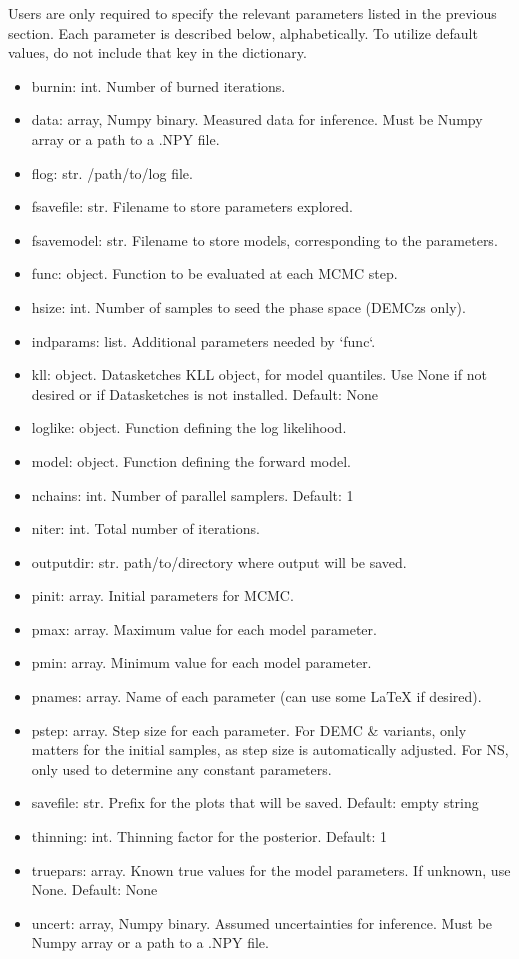 \documentclass[letterpaper, 12pt]{article}
\begin{document}
Users are only required to specify the relevant parameters listed in 
the previous section.  Each parameter is described below, alphabetically.
To utilize default values, do not include that key in the dictionary.

\begin{itemize}
\item burnin: int. Number of burned iterations.
\item data: array, Numpy binary. Measured data for inference. Must be Numpy 
                                 array or a path to a .NPY file.
\item flog: str.   /path/to/log file.
\item fsavefile: str. Filename to store parameters explored.
\item fsavemodel: str. Filename to store models, corresponding to the parameters.
\item func: object. Function to be evaluated at each MCMC step.
\item hsize: int. Number of samples to seed the phase space (DEMCzs only).
\item indparams: list. Additional parameters needed by `func`.
\item kll: object.  Datasketches KLL object, for model quantiles.
                    Use None if not desired or if Datasketches is not installed.
                    Default: None
\item loglike: object. Function defining the log likelihood.
\item model: object. Function defining the forward model.
\item nchains: int. Number of parallel samplers. Default: 1
\item niter: int. Total number of iterations.
\item outputdir: str. path/to/directory where output will be saved.
\item pinit: array. Initial parameters for MCMC.
\item pmax: array. Maximum value for each model parameter.
\item pmin: array. Minimum value for each model parameter.
\item pnames: array. Name of each parameter (can use some LaTeX if desired).
\item pstep: array. Step size for each parameter.  For DEMC \& variants, only 
                    matters for the initial samples, as step size is automatically adjusted.
                    For NS, only used to determine any constant parameters.
\item savefile: str. Prefix for the plots that will be saved. Default: empty string
\item thinning: int. Thinning factor for the posterior. Default: 1
\item truepars: array. Known true values for the model parameters.  
                       If unknown, use None.  Default: None
\item uncert: array, Numpy binary. Assumed uncertainties for inference. Must be 
                                   Numpy array or a path to a .NPY file.
\end{itemize}
\end{document}
